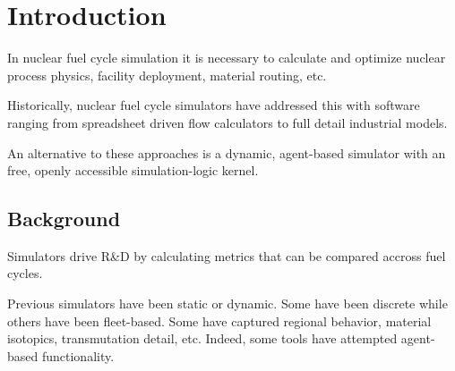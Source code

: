 
\section{Introduction}


In nuclear fuel cycle simulation it is necessary to calculate and optimize 
nuclear process physics, facility deployment, material routing, etc. 


Historically, nuclear fuel cycle simulators have addressed this with software 
ranging from spreadsheet driven flow calculators to full detail industrial 
models. 

An alternative to these approaches is a dynamic, agent-based simulator with an 
free, openly accessible simulation-logic kernel.

\subsection{Background}



Simulators drive R\&D by calculating metrics that can be compared accross fuel 
cycles. 


Previous simulators have been static or dynamic. Some have been discrete while 
others have been fleet-based. Some have captured regional behavior, material 
isotopics, transmutation detail, etc. Indeed, some tools have attempted 
agent-based functionality. %

